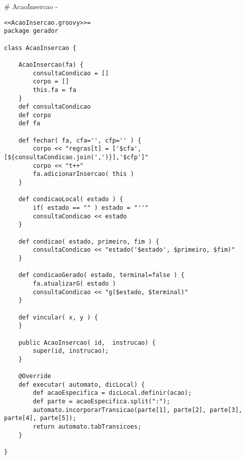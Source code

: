 # AcaoInsercao {-}

\begin{lstlisting}
<<AcaoInsercao.groovy>>=
package gerador

class AcaoInsercao {

    AcaoInsercao(fa) {
        consultaCondicao = []
        corpo = []
        this.fa = fa
    }
    def consultaCondicao
    def corpo
    def fa

    def fechar( fa, cfa='', cfp='' ) {
        corpo << "regras[t] = ['$cfa',[${consultaCondicao.join(',')}],'$cfp']"
        corpo << "t++"
        fa.adicionarInsercao( this )
    }

    def condicaoLocal( estado ) {
        if( estado == "" ) estado = "''"
        consultaCondicao << estado
    }

    def condicao( estado, primeiro, fim ) {
        consultaCondicao << "estado('$estado', $primeiro, $fim)"
    }

    def condicaoGerado( estado, terminal=false ) {
        fa.atualizarG( estado )
        consultaCondicao << "g($estado, $terminal)"
    }

    def vincular( x, y ) {
    }

    public AcaoInsercao( id,  instrucao) {
        super(id, instrucao);
    }

    @Override
    def executar( automato, dicLocal) {
        def acaoEspecifica = dicLocal.definir(acao);
        def parte = acaoEspecifica.split(":");
        automato.incorporarTransicao(parte[1], parte[2], parte[3], parte[4], parte[5]);
        return automato.tabTransicoes;
    }

}


\end{lstlisting}

